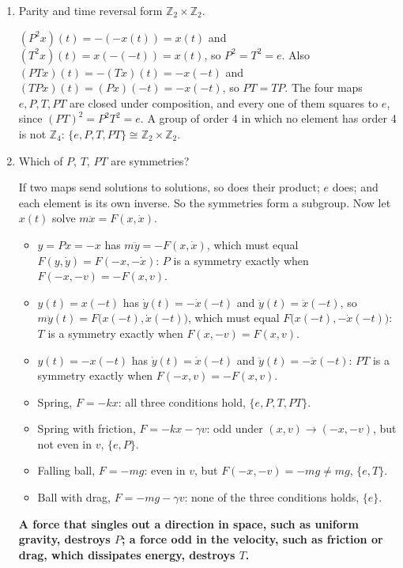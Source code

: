 \documentclass[11pt,a4paper]{article}
\newcommand{\Z}{\mathbb{Z}}
\newenvironment{parts}{\begin{enumerate}[label=\textbf{(\alph*)},leftmargin=2.2em,itemsep=0.6em,topsep=0.2em]}{\end{enumerate}}
\newcommand{\pq}[1]{\item {\color{black!60}#1}\par}
\newcommand{\ans}[1]{{\boldmath\bfseries #1}}
\begin{document}
\begin{parts}
\pq{Parity and time reversal form $\Z_2 \times \Z_2$.}
$(P^2 x)(t) = -(-x(t)) = x(t)$ and $(T^2 x)(t) = x(-(-t)) = x(t)$, so $P^2 = T^2 = e$. Also $(PTx)(t) = -(Tx)(t) = -x(-t)$ and $(TPx)(t) = (Px)(-t) = -x(-t)$, so $PT = TP$. The four maps $e, P, T, PT$ are closed under composition, and every one of them squares to $e$, since $(PT)^2 = P^2 T^2 = e$. A group of order 4 in which no element has order 4 is not $\Z_4$: \ans{$\{e, P, T, PT\} \cong \Z_2 \times \Z_2$}.

\pq{Which of $P$, $T$, $PT$ are symmetries?}
If two maps send solutions to solutions, so does their product; $e$ does; and each element is its own inverse. So the symmetries form a subgroup. Now let $x(t)$ solve $m\ddot x = F(x, \dot x)$.
\begin{itemize}
  \item $y = Px = -x$ has $m\ddot y = -F(x, \dot x)$, which must equal $F(y, \dot y) = F(-x, -\dot x)$: $P$ is a symmetry exactly when $F(-x, -v) = -F(x, v)$.
  \item $y(t) = x(-t)$ has $\dot y(t) = -\dot x(-t)$ and $\ddot y(t) = \ddot x(-t)$, so $m\ddot y(t) = F\bigl(x(-t), \dot x(-t)\bigr)$, which must equal $F\bigl(x(-t), -\dot x(-t)\bigr)$: $T$ is a symmetry exactly when $F(x, -v) = F(x, v)$.
  \item $y(t) = -x(-t)$ has $\dot y(t) = \dot x(-t)$ and $\ddot y(t) = -\ddot x(-t)$: $PT$ is a symmetry exactly when $F(-x, v) = -F(x, v)$.
\end{itemize}
\begin{itemize}
  \item Spring, $F = -kx$: all three conditions hold, \ans{$\{e, P, T, PT\}$}.
  \item Spring with friction, $F = -kx - \gamma v$: odd under $(x, v) \to (-x, -v)$, but not even in $v$, \ans{$\{e, P\}$}.
  \item Falling ball, $F = -mg$: even in $v$, but $F(-x, -v) = -mg \ne mg$, \ans{$\{e, T\}$}.
  \item Ball with drag, $F = -mg - \gamma v$: none of the three conditions holds, \ans{$\{e\}$}.
\end{itemize}
\ans{A force that singles out a direction in space, such as uniform gravity, destroys $P$; a force odd in the velocity, such as friction or drag, which dissipates energy, destroys $T$.}
\end{parts}
\end{document}
